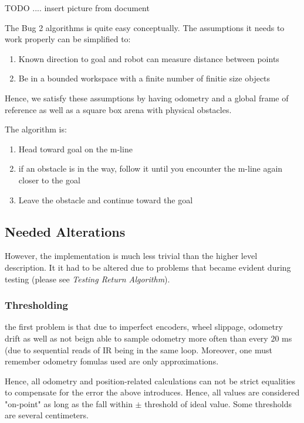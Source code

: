 \documentclass[11pt, a4paper]{article}
\begin{document}
TODO .... insert picture from document


The Bug 2 algorithms is quite easy conceptually. The assumptions it needs to work properly can be simplified to:

\begin{enumerate}

	\item Known direction to goal and robot can measure distance between points
	\item Be in a bounded workspace with a finite number of finitie size objects

\end{enumerate}

Hence, we satisfy these assumptions by having odometry and a global frame of reference as well 
as a square box arena with physical obstacles.

The algorithm is:

\begin{enumerate}

	\item Head toward goal on the m-line
	\item if an obstacle is in the way, follow it until you encounter the m-line again closer to the goal
	\item Leave the obstacle and continue toward the goal

\end{enumerate}

\subsection{Needed Alterations}

However, the implementation is much less trivial than the higher level description. It it had 
to be altered due to problems that became evident during testing (please see \textit{Testing Return Algorithm}).

\subsubsection{Thresholding}

the first problem is that due to imperfect encoders, wheel slippage, odometry drift as well as not
beign able to sample odometry more often than every $20$ ms\cite{khepera_manual} (due to sequential 
reads of IR being in the same loop. Moreover, one must remember odometry fomulas used are only approximations.

Hence, all odometry and position-related calculations can not be strict equalities to compensate 
for the error the above introduces. Hence, all values are considered "on-point" as long as the 
fall within $\pm$ threshold of ideal value. Some thresholds are several centimeters.
\end{document}
